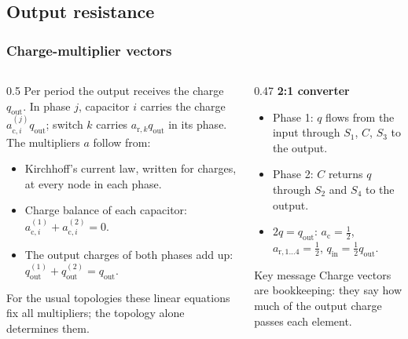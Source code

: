 \subsection{Output resistance}

\begin{frame}
	\frametitle{Charge-multiplier vectors}
	\begin{columns}[T]
		\begin{column}{0.5\textwidth}
			\footnotesize
			Per period the output receives the charge $q_\mathrm{out}$. In phase $j$, capacitor $i$ carries the charge $a_{\mathrm{c},i}^{(j)}q_\mathrm{out}$; switch $k$ carries $a_{\mathrm{r},k}q_\mathrm{out}$ in its phase. The multipliers $a$ follow from:
			\begin{itemize}
				\item Kirchhoff's current law, written for charges, at every node in each phase.
				\item Charge balance of each capacitor: $a_{\mathrm{c},i}^{(1)}+a_{\mathrm{c},i}^{(2)}=0$.
				\item The output charges of both phases add up: $q_\mathrm{out}^{(1)}+q_\mathrm{out}^{(2)}=q_\mathrm{out}$.
			\end{itemize}
			For the usual topologies these linear equations fix all multipliers; the topology alone determines them.
		\end{column}
		\begin{column}{0.47\textwidth}
			\footnotesize
			\textbf{2:1 converter}
			\begin{itemize}
				\item Phase 1: $q$ flows from the input through $S_1$, $C$, $S_3$ to the output.
				\item Phase 2: $C$ returns $q$ through $S_2$ and $S_4$ to the output.
				\item $2q=q_\mathrm{out}$: $a_\mathrm{c}=\tfrac12$, $a_{\mathrm{r},1\ldots4}=\tfrac12$, $q_\mathrm{in}=\tfrac12q_\mathrm{out}$.
			\end{itemize}
			\begin{block}{Key message}
				Charge vectors are bookkeeping: they say how much of the output charge passes each element.
			\end{block}
		\end{column}
	\end{columns}
\end{frame}

